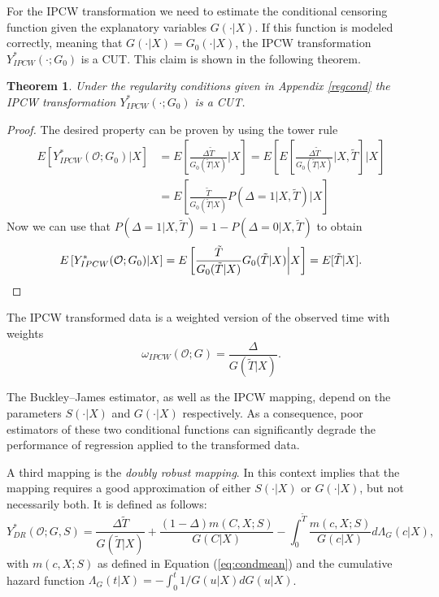\documentclass[12pt, a4paper]{scrartcl}
\theoremstyle{definition}
\theoremstyle{plain}
\newtheorem{Theorem}{Theorem}[section]
\numberwithin{equation}{section}
\numberwithin{figure}{section}
\numberwithin{table}{section}
\begin{document}
	For the IPCW transformation we need to estimate the conditional censoring function given the explanatory variables $G(\cdot\vert X)$.
	If this function is modeled correctly, meaning that $G(\cdot\vert X)=G_0(\cdot\vert X)$, the IPCW transformation $Y_{IPCW}^*(\cdot; G_0)$ is a CUT.
	This claim is shown in the following theorem.
	\begin{Theorem}
		Under the regularity conditions given in Appendix \ref{regcond} the IPCW transformation $Y_{IPCW}^*(\cdot; G_0)$ is a CUT.
	\end{Theorem}
	\begin{proof}
		The desired property can be proven by using the tower rule
		\begin{equation*}
		\begin{split}
		E\left[Y_{IPCW}^*(\mathcal{O}; G_0)\vert X\right] &={} E\left[\frac{\Delta \tilde T}{G_0(\tilde T\vert X)}\bigg\vert X\right] = E\left[E\left[\frac{\Delta \tilde T}{G_0(\tilde T\vert X)}\bigg\vert X, \tilde T\right]\bigg\vert X\right]\\
		&={} E\left[\frac{\tilde T}{G_0(\tilde T \vert X)}P(\Delta = 1 \vert X, \tilde T)\bigg\vert X\right]
		\end{split}
		\end{equation*}
		Now we can use that $P(\Delta = 1\vert X, \tilde T) = 1-P(\Delta = 0\vert X, \tilde T)$ to obtain
		\begin{equation*}
		E\left[Y_{IPCW}^*(\mathcal{O}; G_0)\vert X\right] = E\left[\frac{\tilde T}{G_0(\tilde T \vert X)}G_0(\tilde T \vert X)\bigg\vert X\right] = E[\tilde T \vert X]. \qedhere
		\end{equation*}
	\end{proof}
		
	The IPCW transformed data is a weighted version of the observed time with weights
	\begin{equation}\label{eq:ipcw}
	\omega_{IPCW}(\mathcal{O}; G) = \frac{\Delta}{G(\tilde T \vert X)}.
	\end{equation}

	The Buckley--James estimator, as well as the IPCW mapping, depend on the parameters $S(\cdot\vert X)$ and $G(\cdot\vert X)$ respectively.
	As a consequence, poor estimators of these two conditional functions can significantly degrade the performance of regression applied to the transformed data.
	
	A third mapping is the \emph{doubly robust mapping}.
	In this context  implies that the mapping requires a good approximation of either  $S(\cdot\vert X)$ or $G(\cdot\vert X)$, but not necessarily both.
	It is defined as follows:
	\begin{equation}\label{eq:drcut}
	Y_{DR}^* (\mathcal{O}; G, S) = \frac{\Delta \tilde T}{G(\tilde T\vert X)} + \frac{(1-\Delta)m(C,X;S)}{G(C \vert X)} - \int_{0}^{\tilde T} \frac{m(c,X;S)}{G(c \vert X)} d\Lambda_G(c \vert X),
	\end{equation}
	with $m(c,X;S)$ as defined in Equation (\ref{eq:condmean}) and the cumulative hazard function $\Lambda_G(t\vert X)=-\int_{0}^{t}1/G(u\vert X)dG(u\vert X)$.
	
\end{document}
